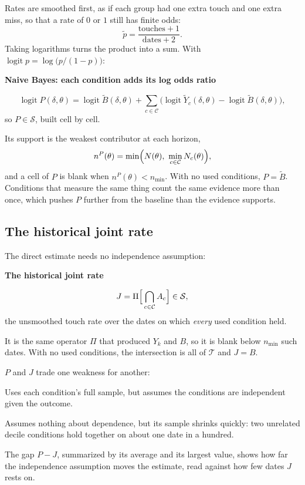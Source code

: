 \documentclass[11pt]{article}
\newenvironment{keyconcept}[1]{%
  \par\addvspace{8pt}\begin{lrbox}{\conceptbox}%
  \begin{minipage}{\dimexpr\linewidth-24pt\relax}%
  \setlength{\parindent}{0pt}%
  {\normalsize\bfseries\color{ConceptInk}#1\par}\large
}{%
  \end{minipage}\end{lrbox}%
  \noindent{\setlength{\fboxsep}{12pt}%
  \colorbox{ConceptPaper}{\usebox{\conceptbox}}}\par\addvspace{8pt}}
\begin{document}
Rates are smoothed first, as if each group had one extra touch and one extra
miss, so that a rate of $0$ or $1$ still has finite odds:
\[
 \tilde p=\frac{\text{touches}+1}{\text{dates}+2}.
\]
Taking logarithms turns the product into a sum. With
$\operatorname{logit}p=\log\bigl(p/(1-p)\bigr)$:
\begin{keyconcept}{Naive Bayes: each condition adds its log odds ratio}
\[
 \operatorname{logit}P(\delta,\theta)
 =\operatorname{logit}\tilde B(\delta,\theta)
  +\sum_{c\in\mathcal C}\bigl(\operatorname{logit}\tilde Y_c(\delta,\theta)-\operatorname{logit}\tilde B(\delta,\theta)\bigr),
\]
\normalsize so $P\in\mathcal S$, built cell by cell.
\end{keyconcept}
Its support is the weakest contributor at each horizon,
\[
 n^P(\theta)=\min\Bigl(N(\theta),\ \min_{c\in\mathcal C}N_c(\theta)\Bigr),
\]
and a cell of $P$ is blank when $n^P(\theta)<n_{\min}$. With no used
conditions, $P=\tilde B$. Conditions that measure the same thing count the same evidence
more than once, which pushes $P$ further from the baseline than the evidence
supports.

\subsection{The historical joint rate}

The direct estimate needs no independence assumption:
\begin{keyconcept}{The historical joint rate}
\[
 J=\Pi\Bigl[\,\bigcap_{c\in\mathcal C}A_c\Bigr]\in\mathcal S,
\]
\normalsize the unsmoothed touch rate over the dates on which \emph{every}
used condition held.
\end{keyconcept}
It is the same operator $\Pi$ that produced $Y_k$ and $B$, so it is blank
below $n_{\min}$ such dates. With no used conditions, the intersection is
all of $\mathcal T$ and $J=B$.

$P$ and $J$ trade one weakness for another:
\begin{description}[font=\normalfont\large\bfseries\color{ConceptInk}]
 \item[Naive Bayes Surface $P$] Uses each condition's full sample, but
       assumes the conditions are independent given the outcome.
 \item[Historical joint Surface $J$] Assumes nothing about dependence, but
       its sample shrinks quickly: two unrelated decile conditions hold
       together on about one date in a hundred.
\end{description}
The gap $P-J$, summarized by its average and its largest value, shows how far
the independence assumption moves the estimate, read against how few dates
$J$ rests on.
\end{document}

